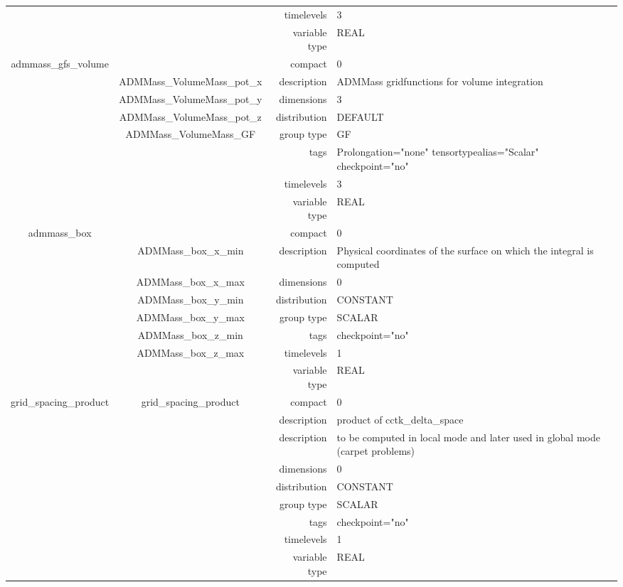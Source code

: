 \begin{tabular*}{150mm}{|c|c@{\extracolsep{\fill}}|rl|}
 &  & timelevels & 3 \\ 
 &  & variable type & REAL \\ 
\hline 
admmass\_gfs\_volume &  & compact & 0 \\ 
 & ADMMass\_VolumeMass\_pot\_x & description & ADMMass gridfunctions for volume integration \\ 
 & ADMMass\_VolumeMass\_pot\_y & dimensions & 3 \\ 
 & ADMMass\_VolumeMass\_pot\_z & distribution & DEFAULT \\ 
 & ADMMass\_VolumeMass\_GF & group type & GF \\ 
 &  & tags & Prolongation="none" tensortypealias="Scalar" checkpoint="no" \\ 
 &  & timelevels & 3 \\ 
 &  & variable type & REAL \\ 
\hline 
admmass\_box &  & compact & 0 \\ 
 & ADMMass\_box\_x\_min & description & Physical coordinates of the surface on which the integral is computed \\ 
 & ADMMass\_box\_x\_max & dimensions & 0 \\ 
 & ADMMass\_box\_y\_min & distribution & CONSTANT \\ 
 & ADMMass\_box\_y\_max & group type & SCALAR \\ 
 & ADMMass\_box\_z\_min & tags & checkpoint="no" \\ 
 & ADMMass\_box\_z\_max & timelevels & 1 \\ 
 &  & variable type & REAL \\ 
\hline 
grid\_spacing\_product & grid\_spacing\_product & compact & 0 \\ 
 &  & description & product of cctk\_delta\_space \\ 
& ~ & description &  to be computed in local mode and later used in global mode (carpet problems) \\ 
 &  & dimensions & 0 \\ 
 &  & distribution & CONSTANT \\ 
 &  & group type & SCALAR \\ 
 &  & tags & checkpoint="no" \\ 
 &  & timelevels & 1 \\ 
 &  & variable type & REAL \\ 
\hline 
\end{tabular*} 



\vspace{5mm}

